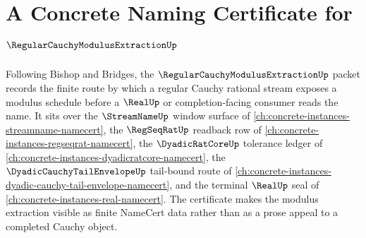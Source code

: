 \chapter{A Concrete Naming Certificate for $\RegularCauchyModulusExtractionUp$}
\label{ch:concrete-instances-regular-cauchy-modulus-extraction-namecert}

Following Bishop and Bridges, the $\RegularCauchyModulusExtractionUp$ packet records the finite route by which a regular Cauchy rational stream exposes a modulus schedule before a $\RealUp$ or completion-facing consumer reads the name. It sits over the $\StreamNameUp$ window surface of \autoref{ch:concrete-instances-streamname-namecert}, the $\RegSeqRatUp$ readback row of \autoref{ch:concrete-instances-regseqrat-namecert}, the $\DyadicRatCoreUp$ tolerance ledger of \autoref{ch:concrete-instances-dyadicratcore-namecert}, the $\DyadicCauchyTailEnvelopeUp$ tail-bound route of \autoref{ch:concrete-instances-dyadic-cauchy-tail-envelope-namecert}, and the terminal $\RealUp$ seal of \autoref{ch:concrete-instances-real-namecert}. The certificate makes the modulus extraction visible as finite NameCert data rather than as a prose appeal to a completed Cauchy object.

